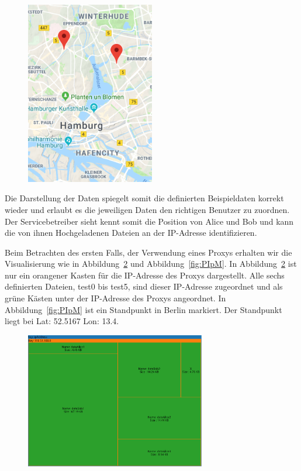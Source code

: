 \documentclass[
    fontsize=12pt,
    headings=small,
    parskip=half,           %
    bibliography=totoc,
    numbers=noenddot,       %
    open=any,               %
    ]{scrreprt}
\begin{document}
\begin{figure}[H]
\includegraphics[width=0.5\textwidth , height=0.4\textheight]{../pic/IP-Proxy-SetA.PNG}
\label{fig:ungIpM}
\end{figure}

Die Darstellung der Daten spiegelt somit die definierten Beispieldaten korrekt wieder und erlaubt es die jeweiligen Daten den richtigen Benutzer zu zuordnen. Der Servicebetreiber sieht kennt somit die Position von Alice und Bob und kann die von ihnen Hochgeladenen Dateien an der IP-Adresse identifizieren.

Beim Betrachten des ersten Falls, der Verwendung eines Proxys erhalten wir die Visualisierung wie in Abbildung~\ref{fig:PIpTM} und Abbildung~\ref{fig:PIpM}.
In Abbildung~\ref{fig:PIpTM} ist nur ein orangener Kasten für die IP-Adresse des Proxys dargestellt.
Alle sechs definierten Dateien, test0 bis test5, sind dieser IP-Adresse zugeordnet und als grüne Kästen unter der IP-Adresse des Proxys angeordnet.
In Abbildung~\ref{fig:PIpM} ist ein Standpunkt in Berlin markiert.
Der Standpunkt liegt bei Lat: 52.5167 Lon: 13.4. 

\begin{figure}[H]
\includegraphics[width=0.7\textwidth]{../pic/IP-Proxy-SetB-tree3.PNG}
\label{fig:PIpTM}
\end{figure}
\end{document}
